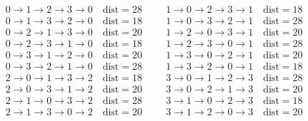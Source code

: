 \newpage\appendix
	\begin{table}[h]
		\[
		\begin{split}
			&0 \rightarrow 1 \rightarrow 2 \rightarrow 3 \rightarrow 0 \quad \text{dist}=28 \hspace{1cm} 1 \rightarrow 0 \rightarrow 2 \rightarrow 3 \rightarrow 1 \quad \text{dist}=18 \\
			&0 \rightarrow 1 \rightarrow 3 \rightarrow 2 \rightarrow 0 \quad \text{dist}=18 \hspace{1cm} 1 \rightarrow 0 \rightarrow 3 \rightarrow 2 \rightarrow 1 \quad \text{dist}=28\\
			&0 \rightarrow 2 \rightarrow 1 \rightarrow 3 \rightarrow 0 \quad \text{dist}=20 \hspace{1cm} 1 \rightarrow 2 \rightarrow 0 \rightarrow 3 \rightarrow 1 \quad \text{dist}=20\\
			&0 \rightarrow 2 \rightarrow 3 \rightarrow 1 \rightarrow 0 \quad \text{dist}=18 \hspace{1cm} 1 \rightarrow 2 \rightarrow 3 \rightarrow 0 \rightarrow 1 \quad \text{dist}=28\\
			&0 \rightarrow 3 \rightarrow 1 \rightarrow 2 \rightarrow 0 \quad \text{dist}=20 \hspace{1cm} 1 \rightarrow 3 \rightarrow 0 \rightarrow 2 \rightarrow 1 \quad \text{dist}=20\\
			&0 \rightarrow 3 \rightarrow 2 \rightarrow 1 \rightarrow 0 \quad \text{dist}=28 \hspace{1cm} 1 \rightarrow 3 \rightarrow 2 \rightarrow 0 \rightarrow 1 \quad \text{dist}=18\\ 
			&2 \rightarrow 0 \rightarrow 1 \rightarrow 3 \rightarrow 2 \quad \text{dist}=18 \hspace{1cm} 3 \rightarrow 0 \rightarrow 1 \rightarrow 2 \rightarrow 3 \quad \text{dist}=28 \\
			&2 \rightarrow 0 \rightarrow 3 \rightarrow 1 \rightarrow 2 \quad \text{dist}=20 \hspace{1cm} 3 \rightarrow 0 \rightarrow 2 \rightarrow 1 \rightarrow 3 \quad \text{dist}=20\\
			&2 \rightarrow 1 \rightarrow 0 \rightarrow 3 \rightarrow 2 \quad \text{dist}=28 \hspace{1cm} 3 \rightarrow 1 \rightarrow 0 \rightarrow 2 \rightarrow 3 \quad \text{dist}=18\\
			&2 \rightarrow 1 \rightarrow 3 \rightarrow 0 \rightarrow 2 \quad \text{dist}=20 \hspace{1cm} 3 \rightarrow 1 \rightarrow 2 \rightarrow 0 \rightarrow 3 \quad \text{dist}=20\\

\end{split}\]
\end{table}
